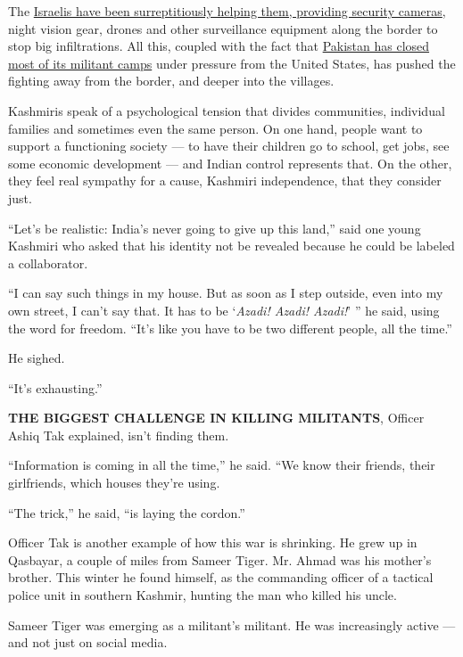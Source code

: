 The
\href{http://indianexpress.com/article/india/israel-fence-systems-quick-response-team-at-pakistanbangladesh-borders-bsf-dg-4794770/}{Israelis
have been surreptitiously helping them, providing security cameras},
night vision gear, drones and other surveillance equipment along the
border to stop big infiltrations. All this, coupled with the fact that
\href{http://www.nytimes.com/2002/01/02/world/india-pakistan-tension-islamabad-pakistan-said-order-end-support-for-militant.html}{Pakistan
has closed most of its militant camps} under pressure from the United
States, has pushed the fighting away from the border, and deeper into
the villages.

Kashmiris speak of a psychological tension that divides communities,
individual families and sometimes even the same person. On one hand,
people want to support a functioning society --- to have their children
go to school, get jobs, see some economic development --- and Indian
control represents that. On the other, they feel real sympathy for a
cause, Kashmiri independence, that they consider just.

``Let's be realistic: India's never going to give up this land,'' said
one young Kashmiri who asked that his identity not be revealed because
he could be labeled a collaborator.

``I can say such things in my house. But as soon as I step outside, even
into my own street, I can't say that. It has to be `\emph{Azadi! Azadi!
Azadi!}' '' he said, using the word for freedom. ``It's like you have to
be two different people, all the time.''

He sighed.

``It's exhausting.''

\textbf{THE BIGGEST CHALLENGE IN KILLING MILITANTS}, Officer Ashiq Tak
explained, isn't finding them.

``Information is coming in all the time,'' he said. ``We know their
friends, their girlfriends, which houses they're using.

``The trick,'' he said, ``is laying the cordon.''

Officer Tak is another example of how this war is shrinking. He grew up
in Qasbayar, a couple of miles from Sameer Tiger. Mr. Ahmad was his
mother's brother. This winter he found himself, as the commanding
officer of a tactical police unit in southern Kashmir, hunting the man
who killed his uncle.

Sameer Tiger was emerging as a militant's militant. He was increasingly
active --- and not just on social media.

